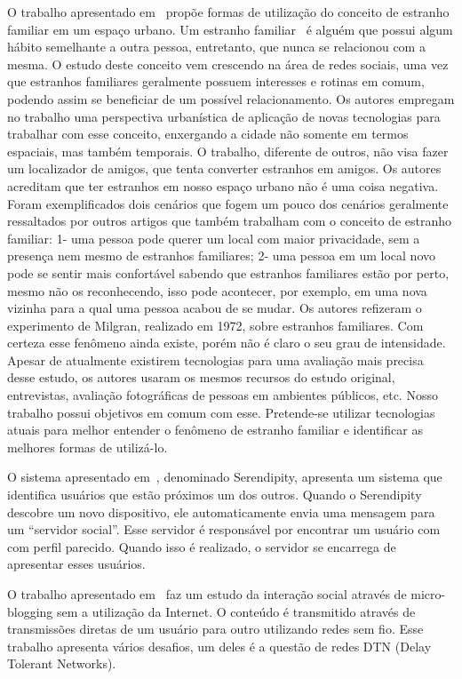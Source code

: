 O trabalho apresentado em~\cite{FamiliarStranger} propõe formas de
utilização do conceito de
estranho familiar em um espaço urbano. Um estranho
familiar~\cite{FamiliarStranger} é alguém que possui algum hábito
semelhante a outra pessoa, entretanto, que nunca se relacionou com a
mesma. O estudo deste conceito vem crescendo na área de redes sociais,
uma vez que estranhos
familiares geralmente possuem interesses e rotinas em comum, podendo
assim se beneficiar de um possível relacionamento. Os autores empregam
no trabalho
uma perspectiva urbanística de aplicação de novas tecnologias para
trabalhar com esse conceito, enxergando a cidade não somente em termos
espaciais, mas também temporais. O trabalho, diferente de outros, não
visa fazer um localizador de amigos, que tenta converter estranhos em
amigos. Os autores acreditam que ter estranhos em nosso espaço urbano
não é uma coisa negativa. Foram exemplificados dois cenários que fogem
um
pouco dos cenários geralmente ressaltados por outros artigos que também
trabalham com o conceito de estranho familiar: 1- uma pessoa pode querer
um local com maior privacidade, sem a presença nem mesmo de estranhos
familiares; 2- uma  pessoa em um local novo pode se sentir mais
confortável sabendo que estranhos familiares estão por  perto, mesmo não
os reconhecendo, isso pode acontecer, por exemplo, em uma nova vizinha
para a  qual uma pessoa acabou de se mudar. Os autores refizeram o
experimento de Milgran, realizado em 1972, sobre estranhos familiares.
Com certeza esse fenômeno ainda existe, porém não é claro o seu grau de
intensidade. Apesar de atualmente existirem tecnologias para uma
avaliação mais precisa desse estudo, os autores usaram os mesmos
recursos do estudo original, entrevistas, avaliação fotográficas de
pessoas em ambientes públicos, etc. Nosso trabalho possui objetivos em
comum com esse. Pretende-se utilizar tecnologias atuais para melhor
entender
o fenômeno de estranho familiar e identificar as melhores formas de
utilizá-lo.

O sistema apresentado em~\cite{SocialSerendipity}, denominado
Serendipity,  apresenta um sistema que
identifica usuários que estão próximos um dos outros. Quando o
Serendipity descobre um novo dispositivo, ele automaticamente envia uma
mensagem para um ``servidor social''. Esse servidor é responsável por
encontrar um usuário com com perfil parecido. Quando isso é realizado, o
servidor se encarrega de apresentar esses usuários.

O trabalho apresentado em~\cite{Uttering}
faz um estudo da interação social através de micro-blogging sem a
utilização da Internet. O conteúdo é transmitido através de transmissões
diretas de um usuário para outro utilizando redes sem fio. Esse trabalho
apresenta vários desafios, um deles é a questão de redes DTN (Delay
Tolerant Networks).

